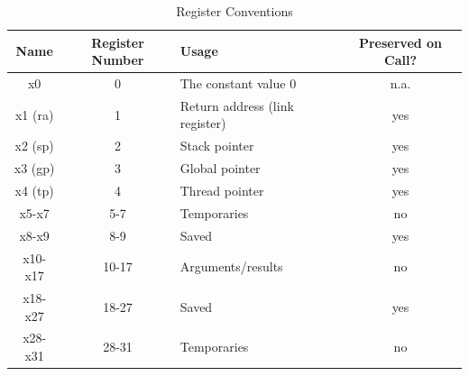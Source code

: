 \begin{table}[h]
    \centering
    \caption{Register Conventions}
    \begin{tabular}{|c|c|l|c|}
        \hline
        \textbf{Name} & \textbf{Register Number} & \textbf{Usage}                 & \textbf{Preserved on Call?} \\
        \hline
        x0            & 0                        & The constant value 0           & n.a.                        \\
        x1 (ra)       & 1                        & Return address (link register) & yes                         \\
        x2 (sp)       & 2                        & Stack pointer                  & yes                         \\
        x3 (gp)       & 3                        & Global pointer                 & yes                         \\
        x4 (tp)       & 4                        & Thread pointer                 & yes                         \\
        x5-x7         & 5-7                      & Temporaries                    & no                          \\
        x8-x9         & 8-9                      & Saved                          & yes                         \\
        x10-x17       & 10-17                    & Arguments/results              & no                          \\
        x18-x27       & 18-27                    & Saved                          & yes                         \\
        x28-x31       & 28-31                    & Temporaries                    & no                          \\
        \hline
    \end{tabular}
\end{table}
